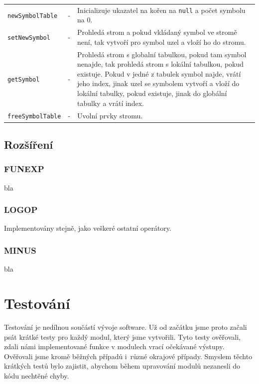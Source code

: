 \documentclass[12pt,a4paper,titlepage,final]{article}
\begin{document}
\begin{tabular}{llp{11.9cm}}
\texttt{newSymbolTable}  & - & Inicializuje ukazatel na kořen na \texttt{null} a počet symbolu na 0.\\
\texttt{setNewSymbol}    & - & Prohledá strom a pokud vkládaný symbol ve stromě není, 
                               tak vytvoří pro symbol uzel a vloží ho do stromu.\\                        
\texttt{getSymbol}       & - & Prohledá strom s globalní tabulkou, pokud tam symbol nenajde,  
                               tak prohledá strom s lokální tabulkou, pokud existuje.  
                               Pokud v jedné z tabulek symbol najde, vrátí jeho index, 
                               jinak uzel se symbolem vytvoří a vloží do lokální tabulky, 
                               pokud existuje, jinak do globální tabulky a vrátí index.\\
\texttt{freeSymbolTable} & - & Uvolní prvky stromu.\\
\end{tabular}
\subsection{Rozšíření}
\subsubsection{FUNEXP}
bla

\subsubsection{LOGOP}
Implementovány stejně, jako veškeré ostatní operátory. %

\subsubsection{MINUS}
bla

\section{Testování} \label{testovani}
Testování je nedílnou součástí vývoje software. Už od začátku jsme proto začali 
psát krátké testy pro každý modul, který jsme vytvořili. Tyto testy ověřovali,
zdali námi implementované funkce v modulech vrací očekávané výstupy. Ověřovali 
jsme kromě běžných případů i~různé okrajové případy. Smyslem těchto krátkých testů 
bylo zajistit, abychom během upravování modulů nezanesli do kódu nechtěné chyby.
\end{document}

